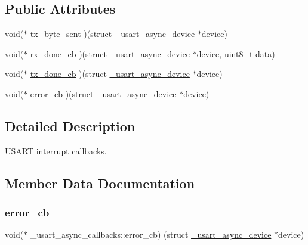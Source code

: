 \subsection*{Public Attributes}
\begin{DoxyCompactItemize}
\item 
void($\ast$ \hyperlink{struct__usart__async__callbacks_a8213240efd24edc2266b1d499b42e945}{tx\+\_\+byte\+\_\+sent} )(struct \hyperlink{struct__usart__async__device}{\+\_\+usart\+\_\+async\+\_\+device} $\ast$device)
\item 
void($\ast$ \hyperlink{struct__usart__async__callbacks_af3670aee54cc400737048dde5c64d30e}{rx\+\_\+done\+\_\+cb} )(struct \hyperlink{struct__usart__async__device}{\+\_\+usart\+\_\+async\+\_\+device} $\ast$device, uint8\+\_\+t data)
\item 
void($\ast$ \hyperlink{struct__usart__async__callbacks_a71fe195e0159ee0b107df69b2b02f619}{tx\+\_\+done\+\_\+cb} )(struct \hyperlink{struct__usart__async__device}{\+\_\+usart\+\_\+async\+\_\+device} $\ast$device)
\item 
void($\ast$ \hyperlink{struct__usart__async__callbacks_a7b926fce0dbc8debda16675111ae754a}{error\+\_\+cb} )(struct \hyperlink{struct__usart__async__device}{\+\_\+usart\+\_\+async\+\_\+device} $\ast$device)
\end{DoxyCompactItemize}


\subsection{Detailed Description}
U\+S\+A\+RT interrupt callbacks. 

\subsection{Member Data Documentation}
\mbox{\label{struct__usart__async__callbacks_a7b926fce0dbc8debda16675111ae754a}} 
\subsubsection{\texorpdfstring{error\+\_\+cb}{error\_cb}}
{\footnotesize\ttfamily void($\ast$ \+\_\+usart\+\_\+async\+\_\+callbacks\+::error\+\_\+cb) (struct \hyperlink{struct__usart__async__device}{\+\_\+usart\+\_\+async\+\_\+device} $\ast$device)}

